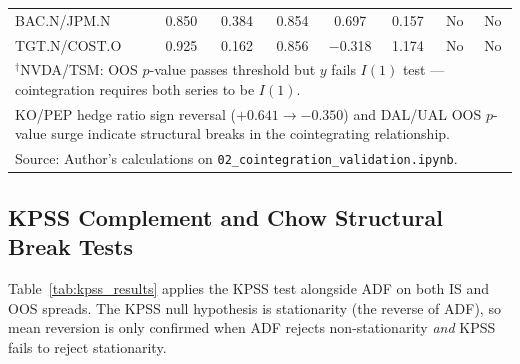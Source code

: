 \documentclass[a4paper]{report}
\begin{document}
\begin{table}[htbp]
{\begin{tabular}{l cc cc c cc}
BAC.N/JPM.N  & 0.850          & 0.384          &  0.854 &  0.697 & 0.157 & No           & No \\
TGT.N/COST.O & 0.925          & 0.162          &  0.856 & $-$0.318 & 1.174 & No          & No \\
\bottomrule
\multicolumn{8}{l}{\small $^{\dagger}$NVDA/TSM: OOS $p$-value passes threshold but $y$ fails $I(1)$ test --- cointegration requires both series to be $I(1)$.} \\
\multicolumn{8}{l}{\small KO/PEP hedge ratio sign reversal ($+0.641 \to -0.350$) and DAL/UAL OOS $p$-value surge indicate structural breaks in the cointegrating relationship.} \\
\multicolumn{8}{l}{\small Source: Author's calculations on \texttt{02\_cointegration\_validation.ipynb}.}
\end{tabular}%
}
\end{table}
\subsection{KPSS Complement and Chow Structural Break Tests}

Table~\ref{tab:kpss_results} applies the KPSS test alongside ADF on both IS and OOS spreads.
The KPSS null hypothesis is stationarity (the reverse of ADF), so mean reversion is only
confirmed when ADF rejects non-stationarity \emph{and} KPSS fails to reject stationarity.

\begin{table}[htbp]
\centering
\caption{ADF and KPSS stationarity tests on IS and OOS spreads (using IS hedge ratios).
Mean-reversion (MR) consensus requires ADF $p < 0.05$ and KPSS $p > 0.05$ simultaneously.}
\label{tab:kpss_results}
\end{table}
\end{document}
